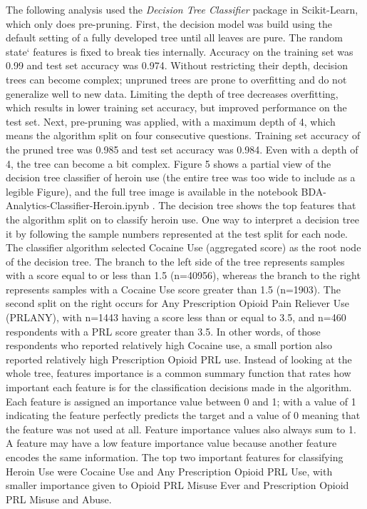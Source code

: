 \documentclass[sigconf]{acmart}
\begin{document}
The following analysis used the \emph{Decision Tree Classifier} package in 
Scikit-Learn, which only does pre-pruning. First, the decision model was build
using the default setting of a fully developed tree until all leaves are pure. 
The random state` features is fixed to break ties internally. Accuracy on the
training set was 0.99 and test set accuracy was 0.974. Without restricting 
their depth, decision trees can become complex; unpruned trees are prone to 
overfitting and do not generalize well to new data. Limiting the depth of 
tree decreases overfitting, which results in lower training set accuracy, 
but improved performance on the test set. Next, pre-pruning was applied, with 
a maximum depth of 4, which means the algorithm split on four consecutive
questions. Training set accuracy of the pruned tree was 0.985 and test set
accuracy was 0.984. Even with a depth of 4, the tree can become a bit complex.
Figure 5 shows a partial view of the decision tree classifier of heroin use 
(the entire tree was too wide to include as a legible Figure), and the full 
tree image is available in the notebook BDA-Analytics-Classifier-Heroin.ipynb 
\cite{classifyH}. The decision tree shows the top features that the algorithm 
split on to classify heroin use. One way to interpret a decision tree it by 
following the sample numbers represented at the test split for each node. 
The classifier algorithm selected Cocaine Use (aggregated score) as the root 
node of the decision tree. The branch to the left  side of the tree represents 
samples with a score equal to or less than 1.5 (n=40956), whereas the branch 
to the right represents samples with a Cocaine Use score greater than 1.5
(n=1903). The second split on the right occurs for Any Prescription Opioid 
Pain Reliever Use (PRLANY), with n=1443 having a score less than or equal 
to 3.5, and n=460 respondents with a PRL score greater than 3.5. In other 
words, of those respondents who reported relatively high Cocaine use, a small
portion also reported relatively high Prescription Opioid PRL use. Instead of 
looking at the whole tree, features importance is a common summary function 
that rates how important each feature is for the classification decisions 
made in the algorithm. Each feature is assigned an importance value between 
0 and 1; with a value of 1 indicating the feature perfectly predicts the 
target and a value of 0 meaning that the feature was not used at all. 
Feature importance values also always sum to 1. A feature may have a low 
feature importance value because another feature encodes the same information. 
The top two important features for classifying Heroin Use were Cocaine Use 
and Any Prescription Opioid PRL Use, with smaller importance given to Opioid 
PRL Misuse Ever and Prescription Opioid PRL Misuse and Abuse. 
\end{document}
